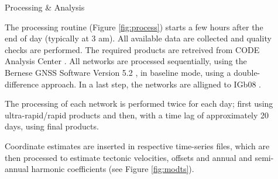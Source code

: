 \documentclass[final,a0,portrait]{beamer}
\newlength{\sepwid}
\newlength{\onecolwid}
\begin{document}
\begin{frame}[t]
\begin{columns}[t]
\begin{column}{\onecolwid}


\end{column} %


\begin{column}{\sepwid}\end{column} %

\begin{column}{\onecolwid} %


\begin{block}{Processing \& Analysis}

{\small
The processing routine (Figure \ref{fig:process}) starts a few hours after the end of day (typically at 3 am). All available data are collected and quality 
checks are performed. The required products are retreived from CODE Analysis Center \cite{codeac}.
All networks are processed sequentially, using the Bernese GNSS Software Version 5.2 \cite{bernese}, in baseline mode, 
using a double-difference approach. In a last step, the networks are alligned to IGb08 \cite{igb08}.

The processing of each network is performed twice for each day; first using ultra-rapid/rapid products and then, with a time 
lag of approximately 20 days, using final products. 

Coordinate estimates are inserted in respective time-series files, which are then processed to estimate tectonic velocities, 
offsets and annual and semi-annual harmonic coefficients (see Figure \ref{fig:modts}).

}
\end{block}
\end{column}
\end{columns}
\end{frame}
\end{document}
